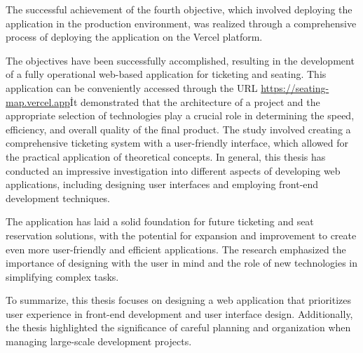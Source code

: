 The successful achievement of the fourth objective, which involved deploying the application in the production environment, was realized through a comprehensive process of deploying the application on the Vercel platform.

The objectives have been successfully accomplished, resulting in the development of a fully operational web-based application for ticketing and seating.
This application can be conveniently accessed through the URL \url{https://seating-map.vercel.app}\.

It demonstrated that the architecture of a project and the appropriate selection of technologies play a crucial role in determining the speed, efficiency, and overall quality of the final product.
The study involved creating a comprehensive ticketing system with a user-friendly interface, which allowed for the practical application of theoretical concepts.
In general, this thesis has conducted an impressive investigation into different aspects of developing web applications, including designing user interfaces and employing front-end development techniques.

The application has laid a solid foundation for future ticketing and seat reservation solutions, with the potential for expansion and improvement to create even more user-friendly and efficient applications.
The research emphasized the importance of designing with the user in mind and the role of new technologies in simplifying complex tasks.

To summarize, this thesis focuses on designing a web application that prioritizes user experience in front-end development and user interface design.
Additionally, the thesis highlighted the significance of careful planning and organization when managing large-scale development projects.
